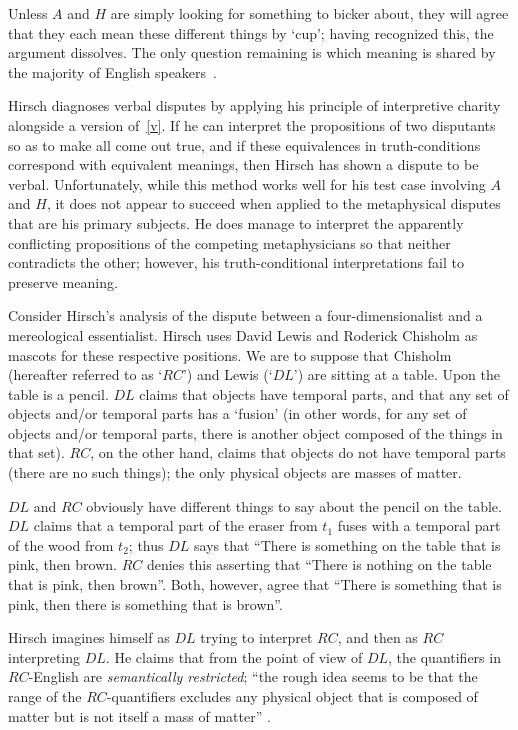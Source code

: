 \documentclass[11pt]{article}
\begin{document}
\begin{spacing}{1.25}
Unless $A$ and $H$ are simply looking for something to bicker about,
they will agree that they each mean these different things by `cup';
having recognized this, the argument dissolves.  The only question
remaining is which meaning is shared by the majority of English
speakers~\citep[70]{hirsch2005}.

Hirsch diagnoses verbal disputes by applying his principle of
interpretive charity alongside a version of~\ref{v}.  If he can
interpret the propositions of two disputants so as to make all come
out true, and if these equivalences in truth-conditions correspond
with equivalent meanings, then Hirsch has shown a dispute to be
verbal.  Unfortunately, while this method works well for his test case
involving $A$ and $H$, it does not appear to succeed when applied to
the metaphysical disputes that are his primary subjects.  He does
manage to interpret the apparently conflicting propositions of the
competing metaphysicians so that neither contradicts the other;
however, his truth-conditional interpretations fail to preserve
meaning.

Consider Hirsch's analysis of the dispute between a
four-dimensionalist and a mereological essentialist.  Hirsch uses
David Lewis and Roderick Chisholm as mascots for these respective
positions.  We are to suppose that Chisholm (hereafter referred to as
`$RC$') and Lewis (`$DL$') are sitting at a table.  Upon the table is
a pencil. $DL$ claims that objects have temporal parts, and that any
set of objects and/or temporal parts has a `fusion' (in other words,
for any set of objects and/or temporal parts, there is another object
composed of the things in that set).  $RC$, on the other hand, claims
that objects do not have temporal parts (there are no such things);
the only physical objects are masses of matter.

$DL$ and $RC$ obviously have different things to say about the pencil
on the table.  $DL$ claims that a temporal part of the eraser from
$t_{1}$ fuses with a temporal part of the wood from $t_{2}$; thus $DL$
says that ``There is something on the table that is pink, then brown.
$RC$ denies this asserting that ``There is nothing on the table that
is pink, then brown''.  Both, however, agree that ``There is something
that is pink, then there is something that is brown''.

Hirsch imagines himself as $DL$ trying to interpret $RC$, and then as
$RC$ interpreting $DL$.  He claims that from the point of view of
$DL$, the quantifiers in $RC$-English are {\em semantically
  restricted}; ``the rough idea seems to be that the range of the
$RC$-quantifiers excludes any physical object that is composed of
matter but is not itself a mass of matter'' \citep[76]{hirsch2005}.


\end{spacing}
\end{document}

